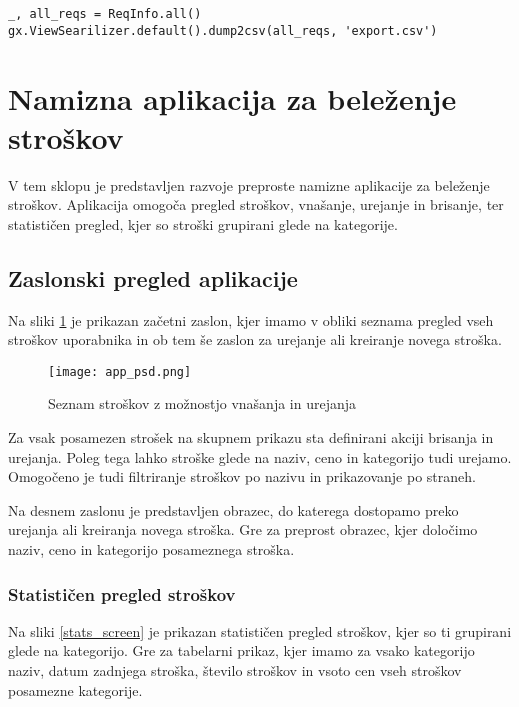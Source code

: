 \documentclass[a4paper,12pt,openright]{book}
\begin{document}
\begin{verbatim}
_, all_reqs = ReqInfo.all()
gx.ViewSearilizer.default().dump2csv(all_reqs, 'export.csv')
\end{verbatim}

    \section{Namizna aplikacija za beleženje stroškov}

    V tem sklopu je predstavljen razvoje preproste namizne aplikacije za beleženje stroškov. Aplikacija omogoča pregled stroškov, vnašanje, urejanje in brisanje, ter statističen pregled, kjer so stroški grupirani glede na kategorije.

    \subsection{Zaslonski pregled aplikacije}
    Na sliki \ref{home_screen} je prikazan začetni zaslon, kjer imamo v obliki seznama pregled vseh stroškov uporabnika in ob tem še zaslon za urejanje ali kreiranje novega stroška. 
    
    \begin{figure}[H]
        \centerline{\texttt{[image: app\_psd.png]}}
        \caption{Seznam stroškov z možnostjo vnašanja in urejanja}
        \label{home_screen}
    \end{figure}

    \noindent
    Za vsak posamezen strošek na skupnem prikazu sta definirani akciji brisanja in urejanja. Poleg tega lahko stroške glede na naziv, ceno in kategorijo tudi urejamo. Omogočeno je tudi filtriranje stroškov po nazivu in prikazovanje po straneh.

    Na desnem zaslonu je predstavljen obrazec, do katerega dostopamo preko urejanja ali kreiranja novega stroška. Gre za preprost obrazec, kjer določimo naziv, ceno in kategorijo posameznega stroška.

    \subsubsection{Statističen pregled stroškov}
    Na sliki \ref{stats_screen} je prikazan statističen pregled stroškov, kjer so ti grupirani glede na kategorijo. Gre za tabelarni prikaz, kjer imamo za vsako kategorijo naziv, datum zadnjega stroška, število stroškov in vsoto cen vseh stroškov posamezne kategorije.
\end{document}
